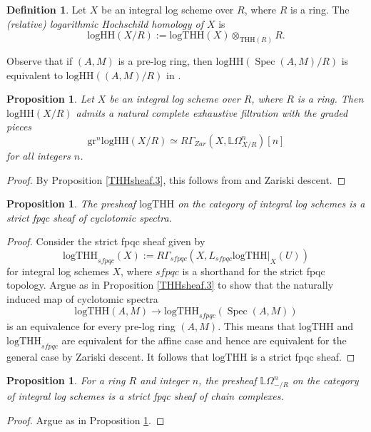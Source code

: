 \documentclass[11pt, a4paper]{amsart}
\newtheorem{prop}[thm]{Proposition}
\theoremstyle{definition}
\newtheorem{df}[thm]{Definition}
\numberwithin{equation}{subsection}
\newcommand{\bbL}{\mathbb{L}}
\providecommand{\Spec}[1]{\operatorname{Spec}(#1)} 	%
\newcommand{\THH}{\mathrm{THH}}
\newcommand{\logTHH}{\mathrm{logTHH}}
\newcommand{\logHH}{\mathrm{logHH}}
\begin{document}
\begin{df}
Let $X$ be an integral log scheme over $R$,
where $R$ is a ring.
The \emph{(relative) logarithmic Hochschild homology of $X$} is
\[
\logHH(X/R)
:=
\logTHH(X)\otimes_{\THH(R)}R.
\]

Observe that if $(A,M)$ is a pre-log ring, then $\logHH(\Spec{A,M}/R)$ is equivalent to $\logHH((A,M)/R)$ in \cite[Definition 5.3]{BLPO}.
\end{df}


\begin{prop}
\label{THHsheaf.7}
Let $X$ be an integral log scheme over $R$,
where $R$ is a ring.
Then $\logHH(X/R)$ admits a natural complete exhaustive filtration with the graded pieces
\[
\mathrm{gr}^n\logHH(X/R)
\simeq
R\Gamma_{Zar}(X,\bbL\Omega^n_{X/R})[n]
\]
for all integers $n$.
\end{prop}
\begin{proof}
By Proposition \ref{THHsheaf.3},
this follows from \cite[Theorem 5.15]{BLPO} and Zariski descent.
\end{proof}



\begin{prop}
\label{THHsheaf.5}
The presheaf $\logTHH$ on the category of integral log schemes is a strict fpqc sheaf of cyclotomic spectra.
\end{prop}
\begin{proof}
Consider the strict fpqc sheaf given by
\[
\logTHH_{sfpqc}(X)
:=
R\Gamma_{sfpqc}(X,L_{sfpqc}\logTHH|_X(U))
\]
for integral log schemes $X$,
where $sfpqc$ is a shorthand for the strict fpqc topology.
Argue as in Proposition \ref{THHsheaf.3} to show that the naturally induced map of cyclotomic spectra
\[
\logTHH(A,M)
\to
\logTHH_{sfpqc}(\Spec{A,M})
\]
is an equivalence for every pre-log ring $(A,M)$.
This means that $\logTHH$ and $\logTHH_{sfpqc}$ are equivalent for the affine case and hence are equivalent for the general case by Zariski descent.
It follows that $\logTHH$ is a strict fpqc sheaf.
\end{proof}

\begin{prop}
\label{THHsheaf.8}
For a ring $R$ and integer $n$,
the presheaf $\bbL\Omega^n_{-/R}$ on the category of integral log schemes is a strict fpqc sheaf of chain complexes.
\end{prop}
\begin{proof}
Argue as in Proposition \ref{THHsheaf.5}.
\end{proof}
\end{document}
